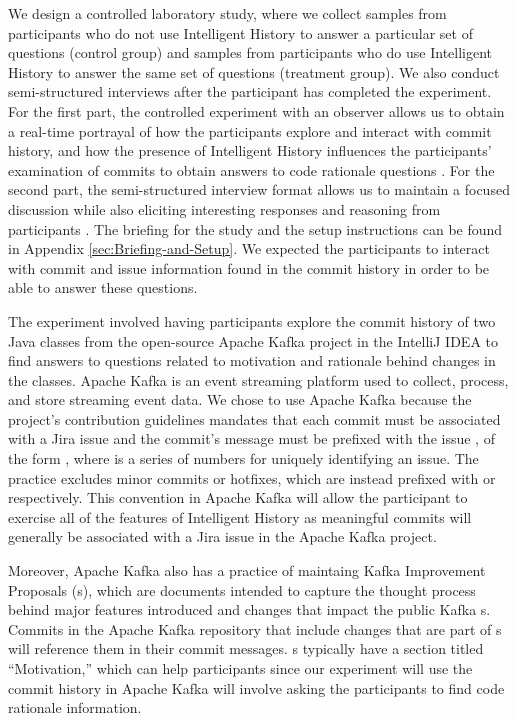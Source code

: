 We design a controlled laboratory study, where we collect samples from
participants who do not use Intelligent History to answer a particular 
set of questions (control group) and samples from participants 
who do use Intelligent History to answer the same set of questions (treatment group).
We also conduct semi-structured interviews after the participant has 
completed the experiment.
For the first part, the controlled experiment with an observer allows us to obtain a real-time 
portrayal of how the participants explore and interact with commit history,
and how the presence of Intelligent History influences the participants'
examination of commits to obtain answers to code rationale questions \cite{shull_guide_2007}.
For the second part, the semi-structured interview format allows us to maintain a focused discussion 
while also eliciting interesting responses and reasoning from participants \cite{shull_guide_2007}.
The briefing for the study and the setup instructions can be found in Appendix \ref{sec:Briefing-and-Setup}.
We expected the participants to interact with commit and issue information 
found in the commit history in order to be able to answer these questions.

The experiment involved having participants explore the commit history of two Java classes 
from the open-source Apache Kafka project in the IntelliJ IDEA  
to find answers to questions related to motivation and rationale behind changes in the classes.
Apache Kafka is an event streaming platform used to collect, process, and store streaming event data.
We chose to use Apache Kafka because the project's contribution guidelines mandates that
each commit must be associated with a Jira issue and the commit's message 
must be prefixed with the issue , of the form , 
where  is a series of numbers for uniquely identifying an issue.
The practice excludes minor commits or hotfixes, 
which are instead prefixed with  or  respectively.
This convention in Apache Kafka will allow the participant to exercise all of the features of Intelligent History
as meaningful commits will generally be associated with a Jira issue in the Apache Kafka project.

Moreover, Apache Kafka also has a practice of maintaing Kafka Improvement Proposals (s),
which are documents intended to capture the thought process behind major features introduced 
and changes that impact the public Kafka s.
Commits in the Apache Kafka repository that include changes that are part of s will
reference them in their commit messages.
s typically have a section titled ``Motivation,''
which can help participants since our experiment will use the commit history 
in Apache Kafka will involve asking the participants to find code rationale information.

